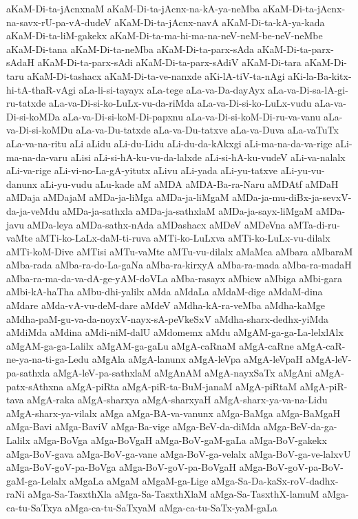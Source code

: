 {aKaM-Di-ta-jAcnxnaM
aKaM-Di-ta-jAcnx-na-kA-ya-neMba
aKaM-Di-ta-jAcnx-na-savx-rU-pa-vA-dudeV
aKaM-Di-ta-jAcnx-navA
aKaM-Di-ta-kA-ya-kada
aKaM-Di-ta-liM-gakekx
aKaM-Di-ta-ma-hi-ma-na-neV-neM-be-neV-neMbe
aKaM-Di-tana
aKaM-Di-ta-neMba
aKaM-Di-ta-parx-sAda
aKaM-Di-ta-parx-sAdaH
aKaM-Di-ta-parx-sAdi
aKaM-Di-ta-parx-sAdiV
aKaM-Di-tara
aKaM-Di-taru
aKaM-Di-tashacx
aKaM-Di-ta-ve-nanxde
aKi-lA-tiV-ta-nAgi
aKi-la-Ba-kitx-hi-tA-thaR-vAgi
aLa-li-si-tayayx
aLa-tege
aLa-va-Da-dayAyx
aLa-va-Di-sa-lA-gi-ru-tatxde
aLa-va-Di-si-ko-LuLx-vu-da-riMda
aLa-va-Di-si-ko-LuLx-vudu
aLa-va-Di-si-koMDa
aLa-va-Di-si-koM-Di-papxnu
aLa-va-Di-si-koM-Di-ru-va-vanu
aLa-va-Di-si-koMDu
aLa-va-Du-tatxde
aLa-va-Du-tatxve
aLa-va-Duva
aLa-vaTuTx
aLa-va-na-ritu
aLi
aLidu
aLi-du-Lidu
aLi-du-da-kAkxgi
aLi-ma-na-da-va-rige
aLi-ma-na-da-varu
aLisi
aLi-si-hA-ku-vu-da-lalxde
aLi-si-hA-ku-vudeV
aLi-va-nalalx
aLi-va-rige
aLi-vi-no-La-gA-yitutx
aLivu
aLi-yada
aLi-yu-tatxve
aLi-yu-vu-danunx
aLi-yu-vudu
aLu-kade
aM
aMDA
aMDA-Ba-ra-Naru
aMDAtf
aMDaH
aMDaja
aMDajaM
aMDa-ja-liMga
aMDa-ja-liMgaM
aMDa-ja-mu-diBx-ja-sevxV-da-ja-veMdu
aMDa-ja-sathxla
aMDa-ja-sathxlaM
aMDa-ja-sayx-liMgaM
aMDa-javu
aMDa-leya
aMDa-sathx-nAda
aMDashacx
aMDeV
aMDeVna
aMTa-di-ru-vaMte
aMTi-ko-LaLx-daM-ti-ruva
aMTi-ko-LuLxva
aMTi-ko-LuLx-vu-dilalx
aMTi-koM-Dive
aMTisi
aMTu-vaMte
aMTu-vu-dilalx
aMaMca
aMbara
aMbaraM
aMba-rada
aMba-ra-do-La-gaNa
aMba-ra-kirxyA
aMba-ra-mada
aMba-ra-madaH
aMba-ra-ma-da-va-dA-ge-yAM-doVLa
aMba-rasayx
aMbicw
aMbiga
aMbi-gara
aMbi-kA-haTha
aMbu-dhi-yalilx
aMda
aMdaLa
aMdaM-dige
aMdaM-dina
aMdare
aMda-vA-vu-deM-dare
aMdeV
aMdha-kA-ra-veMba
aMdha-kaMge
aMdha-paM-gu-va-da-noyxV-nayx-sA-peVkeSxV
aMdha-sharx-dedhx-yiMda
aMdiMda
aMdina
aMdi-niM-dalU
aMdomemx
aMdu
aMgAM-ga-ga-La-lelxlAlx
aMgAM-ga-ga-Lalilx
aMgAM-ga-gaLu
aMgA-caRnaM
aMgA-caRne
aMgA-caR-ne-ya-na-ti-ga-Ledu
aMgAla
aMgA-lanunx
aMgA-leVpa
aMgA-leVpaH
aMgA-leV-pa-sathxla
aMgA-leV-pa-sathxlaM
aMgAnAM
aMgA-nayxSaTx
aMgAni
aMgA-patx-sAthxna
aMgA-piRta
aMgA-piR-ta-BuM-janaM
aMgA-piRtaM
aMgA-piR-tava
aMgA-raka
aMgA-sharxya
aMgA-sharxyaH
aMgA-sharx-ya-va-na-Lidu
aMgA-sharx-ya-vilalx
aMga
aMga-BA-va-vanunx
aMga-BaMga
aMga-BaMgaH
aMga-Bavi
aMga-BaviV
aMga-Ba-vige
aMga-BeV-da-diMda
aMga-BeV-da-ga-Lalilx
aMga-BoVga
aMga-BoVgaH
aMga-BoV-gaM-gaLa
aMga-BoV-gakekx
aMga-BoV-gava
aMga-BoV-ga-vane
aMga-BoV-ga-velalx
aMga-BoV-ga-ve-lalxvU
aMga-BoV-goV-pa-BoVga
aMga-BoV-goV-pa-BoVgaH
aMga-BoV-goV-pa-BoV-gaM-ga-Lelalx
aMgaLa
aMgaM
aMgaM-ga-Lige
aMga-Sa-Da-kaSx-roV-dadhx-raNi
aMga-Sa-TasxthXla
aMga-Sa-TasxthXlaM
aMga-Sa-TasxthX-lamuM
aMga-ca-tu-SaTxya
aMga-ca-tu-SaTxyaM
aMga-ca-tu-SaTx-yaM-gaLa
}
